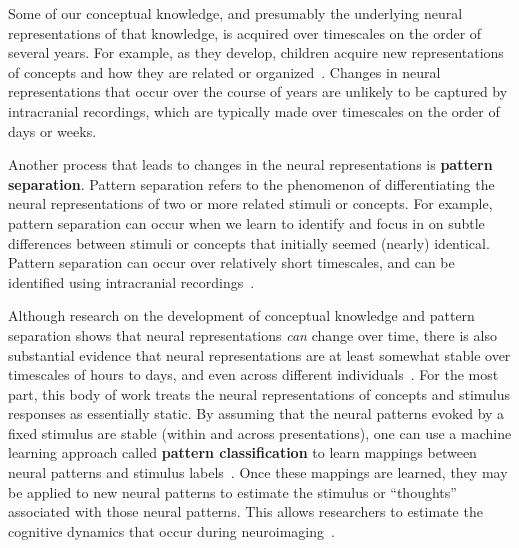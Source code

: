 \documentclass[runningheads]{llncs}
\begin{document}
Some of our conceptual knowledge, and presumably the underlying neural
representations of that knowledge, is acquired over timescales on the
order of several years.  For example, as they develop, children
acquire new representations of concepts and how they are related or
organized~\citep{KrolSund03, BlayEtal06}.  Changes in neural
representations that occur over the course of years are unlikely to be
captured by intracranial recordings, which are typically made over
timescales on the order of days or weeks.

Another process that leads to changes in the neural representations is
\textbf{pattern separation}.  Pattern separation refers to the
phenomenon of differentiating the neural representations of two or
more related stimuli or concepts.  For example, pattern separation can
occur when we learn to identify and focus in on subtle differences
between stimuli or concepts that initially seemed (nearly) identical.
Pattern separation can occur over relatively short timescales, and can
be identified using intracranial recordings~\citep{LeutEtal07b,
  BakkEtal08, Roll13, YassStar11}.

Although research on the development of conceptual knowledge and
pattern separation shows that neural representations \textit{can}
change over time, there is also substantial evidence that neural
representations are at least somewhat stable over timescales of hours
to days, and even across different individuals~\citep{MitcEtal08a,
  HaxbEtal11, ShinEtal08}.  For the most part, this body of work
treats the neural representations of concepts and stimulus responses
as essentially static.  By assuming that the neural patterns evoked by
a fixed stimulus are stable (within and across presentations), one can
use a machine learning approach called \textbf{pattern classification}
to learn mappings between neural patterns and stimulus
labels~\citep{NormEtal06b}.  Once these mappings are learned, they may
be applied to new neural patterns to estimate the stimulus or
``thoughts'' associated with those neural patterns.  This allows
researchers to estimate the cognitive dynamics that occur during
neuroimaging~\citep{PolyEtal05a, PolyEtal07, GersEtal13, MannEtal16,
  ChiuEtal21}.
\end{document}
